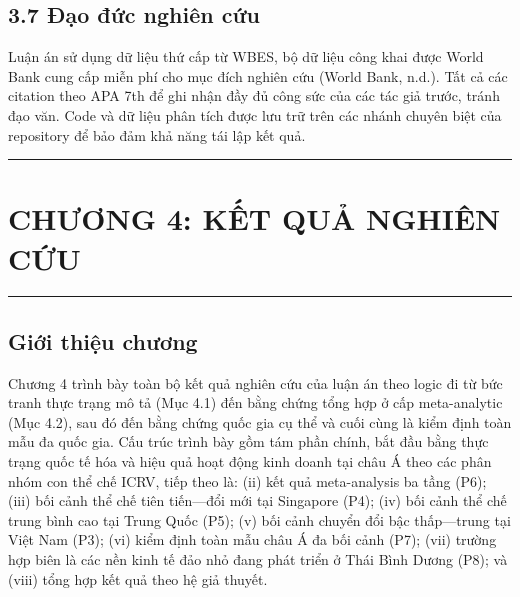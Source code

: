 \documentclass[12pt,a4paper]{article}
\begin{document}
\hypertarget{37-ux111ux1ea1o-ux111ux1ee9c-nghiuxean-cux1ee9u}{%
\subsection{3.7 Đạo đức nghiên
cứu}\label{37-ux111ux1ea1o-ux111ux1ee9c-nghiuxean-cux1ee9u}}

Luận án sử dụng dữ liệu thứ cấp từ WBES, bộ dữ liệu công khai được World
Bank cung cấp miễn phí cho mục đích nghiên cứu (World Bank, n.d.). Tất
cả các citation theo APA 7th để ghi nhận đầy đủ công sức của các tác giả
trước, tránh đạo văn. Code và dữ liệu phân tích được lưu trữ trên các
nhánh chuyên biệt của repository để bảo đảm khả năng tái lập kết quả.

\begin{center}\rule{0.5\linewidth}{0.5pt}\end{center}

\hypertarget{chux1b0ux1a1ng-4-kux1ebft-quux1ea3-nghiuxean-cux1ee9u}{%
\section{CHƯƠNG 4: KẾT QUẢ NGHIÊN
CỨU}\label{chux1b0ux1a1ng-4-kux1ebft-quux1ea3-nghiuxean-cux1ee9u}}

\begin{center}\rule{0.5\linewidth}{0.5pt}\end{center}

\hypertarget{giux1edbi-thiux1ec7u-chux1b0ux1a1ng}{%
\subsection{Giới thiệu
chương}\label{giux1edbi-thiux1ec7u-chux1b0ux1a1ng}}

Chương 4 trình bày toàn bộ kết quả nghiên cứu của luận án theo logic đi
từ bức tranh thực trạng mô tả (Mục 4.1) đến bằng chứng tổng hợp ở cấp
meta-analytic (Mục 4.2), sau đó đến bằng chứng quốc gia cụ thể và cuối
cùng là kiểm định toàn mẫu đa quốc gia. Cấu trúc trình bày gồm tám phần
chính, bắt đầu bằng thực trạng quốc tế hóa và hiệu quả hoạt động kinh
doanh tại châu Á theo các phân nhóm con thể chế ICRV, tiếp theo là: (ii)
kết quả meta-analysis ba tầng (P6); (iii) bối cảnh thể chế tiên
tiến---đổi mới tại Singapore (P4); (iv) bối cảnh thể chế trung bình cao
tại Trung Quốc (P5); (v) bối cảnh chuyển đổi bậc thấp---trung tại Việt
Nam (P3); (vi) kiểm định toàn mẫu châu Á đa bối cảnh (P7); (vii) trường
hợp biên là các nền kinh tế đảo nhỏ đang phát triển ở Thái Bình Dương
(P8); và (viii) tổng hợp kết quả theo hệ giả thuyết.
\end{document}
